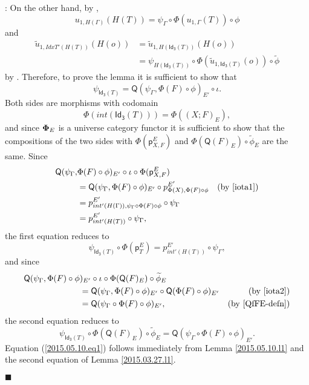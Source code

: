 \documentclass[12pt]{article}
\numberwithin{equation}{section}
\newenvironment{eq}{\begin{equation}}{\end{equation}}
\newenvironment{myproof}{{\bf Proof}:}{$\blacksquare$ \vskip 5mm }
\newcommand{\by}[1]{\text{(by #1)}}
\newcommand{\wt}{\widetilde}
\newcommand{\p}{\mathsf{p}}
\newcommand{\Idx}{\mathsf{Id_3}} %
\newcommand{\Q}{\mathsf{Q}}
\begin{document}
\begin{myproof}
On the other hand, by \cite[Lemma 6.1(1)]{fromunivwithPi},
%
$$u_{1,H(\Gamma)}(H(T))=\psi_{\Gamma}\circ \Phi(u_{1,\Gamma}(T))\circ \phi$$
and
\begin{align*}
  \wt{u}_{1,IdxT'(H(T))}(H(o))
    & = \wt{u}_{1,H(\Idx(T))}(H(o)) \\
    & = \psi_{H(\Idx(T))}\circ \Phi(\wt{u}_{1,\Idx(T)}(o))\circ \wt{\phi}
\end{align*}
%
by \cite[Lemma 6.1(1,2)]{fromunivwithPi}. Therefore, to prove the lemma it is
sufficient to show that
%
$$\psi_{\Idx(T)}=\Q(\psi_{\Gamma},\Phi(F)\circ\phi)_{E'}\circ\iota.$$
%
Both sides are morphisms with codomain
%
$$\Phi(int(\Idx(T)))=\Phi((X;F)_E),$$
%
and since ${\bf\Phi}_E$ is a universe category functor it is sufficient to show
that the compositions of the two sides with $\Phi(\p^E_{X,F})$ and
$\Phi(\Q(F)_E)\circ \wt{\phi}_E$ are the same.  Since
%
\begin{align*}
        \Q(\psi_{\Gamma},&\Phi(F)\circ\phi)_{E'} \circ \iota\circ \Phi(\p^E_{X,F}) \\
    & = \Q(\psi_{\Gamma}, \Phi(F)\circ\phi)_{E'} \circ p^{E'}_{\Phi(X),\Phi(F)\circ\phi} & \by{\ref{iota1}} \\
    & = p^{E'}_{int'(H(\Gamma)),\psi_{\Gamma} \circ \Phi(F)\circ\phi} \circ \psi_\Gamma  \\
    & = p^{E'}_{int'(H(T))}\circ\psi_{\Gamma},
\end{align*}
%
the first equation reduces to
%
\begin{eq}
  \label{2015.05.10.eq1}
  \psi_{\Idx(T)}\circ \Phi(\p^E_{T}) = p^{E'}_{int'(H(T))}\circ\psi_{\Gamma},
\end{eq}%
%
and since
%
\begin{align*}
        \Q(\psi_{\Gamma},\Phi(F)\circ\phi&)_{E'}\circ \iota\circ \Phi(\Q(F)_E)\circ \wt{\phi}_E \\
    & = \Q(\psi_{\Gamma},\Phi(F) \circ\phi)_{E'}\circ \Q(\Phi(F)\circ\phi)_{E'}                 & \by{\ref{iota2}} \\
    & = \Q(\psi_{\Gamma}\circ \Phi(F)\circ \phi)_{E'},                                           & \by{\ref{QfFE-defn}}
\end{align*}
%
the second equation reduces to
%
\begin{eq}
  \label{2015.05.10.eq2.0}
  \psi_{\Idx(T)}\circ \Phi(\Q(F)_E)\circ \wt{\phi}_E = \Q(\psi_{\Gamma}\circ \Phi(F)\circ \phi)_{E'}.
\end{eq}%
%
Equation (\ref{2015.05.10.eq1}) follows immediately from Lemma
\ref{2015.05.10.l1} and the second equation of Lemma \ref{2015.03.27.l1}.


\end{myproof}
\end{document}
